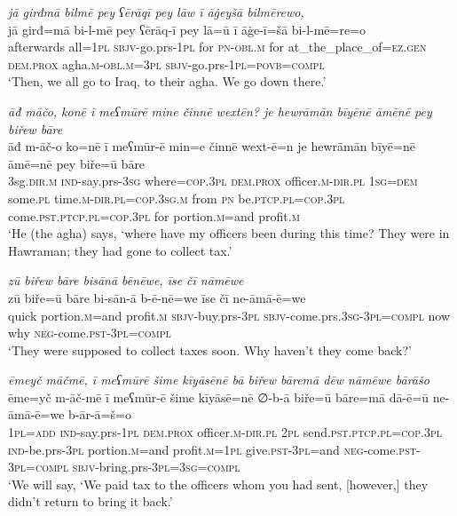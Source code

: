 \ea \label{BP.56}
\textit{jā girđmā bilmē pey ʕērāqī pey lāw ī āġeyšā bilmērewo,} \\ 
\gll jā girđ=mā bi-l-mē pey ʕērāq-ī pey lā=ū ī āġe-ī=šā bi-l-mē=re=o \\ 
 afterwards all\textsc{=\textsc{1pl}} \textsc{sbjv-}go.prs\textsc{-\textsc{1pl}} for \textsc{pn}\textsc{-obl}\textsc{.m} for at\_the\_place\_of\textsc{=ez.gen} \textsc{dem.prox} agha\textsc{.m}\textsc{-obl}\textsc{.m}\textsc{=3pl} \textsc{sbjv-}go.prs\textsc{-\textsc{1pl}}\textsc{=\textsc{povb}}\textsc{=compl} \\ 
\glt `Then, we all go to Iraq, to their agha. We go down there.'
\z 
 
\ea \label{BP.57}
\textit{āđ māčo, konē ī meʕmūrē mine činnē wextēn? je hewrāmān bīyēnē āmēnē pey biřew bāre} \\ 
\gll āđ m-āč-o ko=nē ī meʕmūr-ē min=e činnē wext-ē=n je hewrāmān bīyē=nē āmē=nē pey biře=ū bāre \\ 
 3sg\textsc{.dir}\textsc{.m} \textsc{ind-}say.prs\textsc{-3sg} where\textsc{=cop}\textsc{.3pl} \textsc{dem.prox} officer\textsc{.m}\textsc{-dir}\textsc{.pl} \textsc{1sg}\textsc{=dem} some\textsc{.pl} time\textsc{.m}\textsc{-dir}\textsc{.pl}\textsc{=cop}\textsc{.3sg}\textsc{.m} from \textsc{pn} be\textsc{.ptcp}\textsc{.pl}\textsc{=cop}\textsc{.3pl} come\textsc{.pst}\textsc{.ptcp}\textsc{.pl}\textsc{=cop}\textsc{.3pl} for portion\textsc{.m}=and profit\textsc{.m} \\ 
\glt `He (the agha) says, ‘where have my officers been during this time? They were in Hawraman; they had gone to collect tax.'
\z 
 
\ea \label{BP.58}
\textit{zū biřew bāre bisānā bēnēwe, īse čī nāmēwe} \\ 
\gll zū biře=ū bāre bi-sān-ā b-ē-nē=we īse čī ne-āmā-ē=we \\ 
 quick portion\textsc{.m}=and profit\textsc{.m} \textsc{sbjv-}buy.prs\textsc{-3pl} \textsc{sbjv-}come.prs\textsc{.3sg}\textsc{-3pl}\textsc{=compl} now why \textsc{neg-}come\textsc{.pst}\textsc{-3pl}\textsc{=compl} \\ 
\glt `They were supposed to collect taxes soon. Why haven’t they come back?'
\z 
 
\ea \label{BP.60}
\textit{ēmeyč māčmē, ī meʕmūrē šime kīyāsēnē bā biřew bāremā dēw nāmēwe bārāšo} \\ 
\gll ēme=yč m-āč-mē ī meʕmūr-ē šime kīyāsē=nē ∅-b-ā biře=ū bāre=mā dā-ē=ū ne-āmā-ē=we b-ār-ā=š=o \\ 
 \textsc{1pl}\textsc{=add} \textsc{ind-}say.prs\textsc{-\textsc{1pl}} \textsc{dem.prox} officer\textsc{.m}\textsc{-dir}\textsc{.pl} \textsc{2pl} send\textsc{.pst}\textsc{.ptcp}\textsc{.pl}\textsc{=cop}\textsc{.3pl} \textsc{ind-}be.prs\textsc{-3pl} portion\textsc{.m}=and profit\textsc{.m}\textsc{=\textsc{1pl}} give\textsc{.pst}\textsc{-3pl}=and \textsc{neg-}come\textsc{.pst}\textsc{-3pl}\textsc{=compl} \textsc{sbjv-}bring.prs\textsc{-3pl}\textsc{=3sg}\textsc{=compl} \\ 
\glt `We will say, ‘We paid tax to the officers whom you had sent, [however,] they didn’t return to bring it back.'
\z 
 
